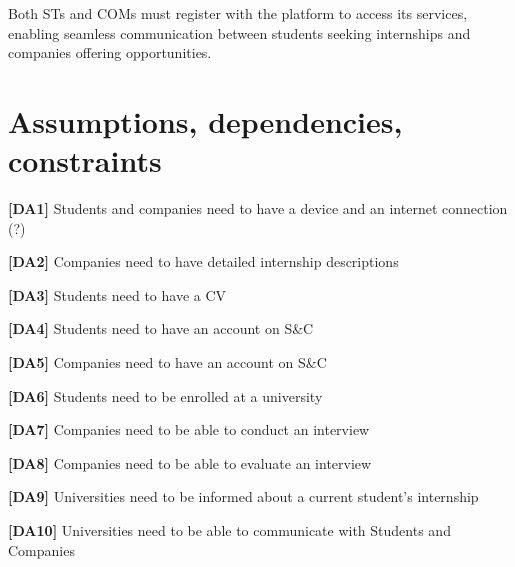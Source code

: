 Both STs and COMs must register with the platform to access its services, enabling seamless communication between students seeking internships and companies offering opportunities.

\section{Assumptions, dependencies, constraints}
\textbf{[DA1] }Students and companies need to have a device and an internet connection (?)

\textbf{[DA2]} Companies need to have detailed internship descriptions

\textbf{[DA3]} Students need to have a CV

\textbf{[DA4]} Students need to have an account on S\&C

\textbf{[DA5]} Companies need to have an account on S\&C

\textbf{[DA6]} Students need to be enrolled at a university 

\textbf{[DA7]} Companies need to be able to conduct an interview

\textbf{[DA8]} Companies need to be able to evaluate an interview

\textbf{[DA9]} Universities need to be informed about a current student's internship

\textbf{[DA10]} Universities need to be able to communicate with Students and Companies

